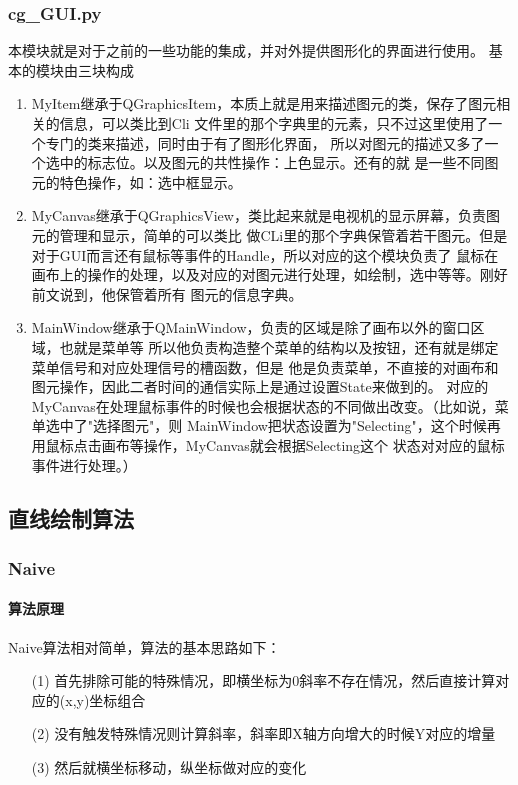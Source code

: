 \documentclass[a4paper,UTF8]{article}
\theoremstyle{definition}
\begin{document}
\subsubsection{cg\_GUI.py}
本模块就是对于之前的一些功能的集成，并对外提供图形化的界面进行使用。
基本的模块由三块构成
\begin{enumerate}
    \item MyItem继承于QGraphicsItem，本质上就是用来描述图元的类，保存了图元相关的信息，可以类比到Cli
    文件里的那个字典里的元素，只不过这里使用了一个专门的类来描述，同时由于有了图形化界面，
    所以对图元的描述又多了一个选中的标志位。以及图元的共性操作：上色显示。还有的就
    是一些不同图元的特色操作，如：选中框显示。
    \item MyCanvas继承于QGraphicsView，类比起来就是电视机的显示屏幕，负责图元的管理和显示，简单的可以类比
    做CLi里的那个字典保管着若干图元。但是对于GUI而言还有鼠标等事件的Handle，所以对应的这个模块负责了
    鼠标在画布上的操作的处理，以及对应的对图元进行处理，如绘制，选中等等。刚好前文说到，他保管着所有
    图元的信息字典。
    \item MainWindow继承于QMainWindow，负责的区域是除了画布以外的窗口区域，也就是菜单等
    所以他负责构造整个菜单的结构以及按钮，还有就是绑定菜单信号和对应处理信号的槽函数，但是
    他是负责菜单，不直接的对画布和图元操作，因此二者时间的通信实际上是通过设置State来做到的。
    对应的MyCanvas在处理鼠标事件的时候也会根据状态的不同做出改变。（比如说，菜单选中了"选择图元"，则
    MainWindow把状态设置为"Selecting"，这个时候再用鼠标点击画布等操作，MyCanvas就会根据Selecting这个
    状态对对应的鼠标事件进行处理。）
\end{enumerate}
\subsection{直线绘制算法}

\subsubsection{Naive}
\paragraph{算法原理} 
Naive算法相对简单，算法的基本思路如下：
\begin{itemize}
    \item [(1)] 
    首先排除可能的特殊情况，即横坐标为0斜率不存在情况，然后直接计算对应的(x,y)坐标组合
    \item [(2)]
    没有触发特殊情况则计算斜率，斜率即X轴方向增大的时候Y对应的增量
    \item [(3)]
    然后就横坐标移动，纵坐标做对应的变化
  \end{itemize}
\end{document}

